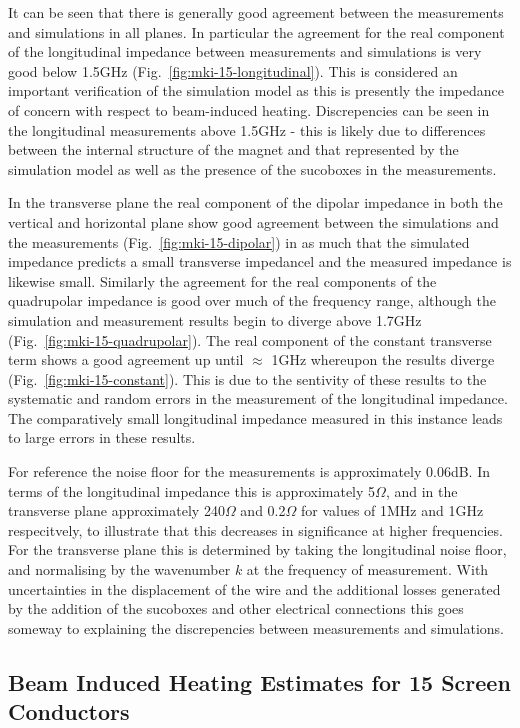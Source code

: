It can be seen that there is generally good agreement between the measurements and simulations in all planes. In particular the agreement for the real component of the longitudinal impedance between measurements and simulations is very good below 1.5GHz (Fig.~\ref{fig:mki-15-longitudinal}). This is considered an important verification of the simulation model as this is presently the impedance of  concern with respect to beam-induced heating. Discrepencies can be seen in the longitudinal measurements above 1.5GHz - this is likely due to differences between the internal structure of the magnet and that represented by the simulation model as well as the presence of the sucoboxes in the measurements.

In the transverse plane the real component of the dipolar impedance in both the vertical and horizontal plane show good agreement between the simulations and the measurements (Fig.~\ref{fig:mki-15-dipolar}) in as much that the simulated impedance predicts a small transverse impedancel and the measured impedance is likewise small. Similarly the agreement for the real components of the quadrupolar impedance is good over much of the frequency range, although the simulation and measurement results begin to diverge above 1.7GHz (Fig.~\ref{fig:mki-15-quadrupolar}). The real component of the constant transverse term shows a good agreement up until $\approx$ 1GHz whereupon the results diverge (Fig.~\ref{fig:mki-15-constant}). This is due to the sentivity of these results to the systematic and random errors in the measurement of the longitudinal impedance. The comparatively small longitudinal impedance measured in this instance leads to large errors in these results. 

For reference the noise floor for the measurements is approximately 0.06dB. In terms of the longitudinal impedance this is approximately 5$\Omega$, and in the transverse plane approximately 240$\Omega$ and 0.2$\Omega$ for values of 1MHz and 1GHz respecitvely, to illustrate that this decreases in significance at higher frequencies. For the transverse plane this is determined by taking the longitudinal noise floor, and normalising by the wavenumber $k$ at the frequency of measurement. With uncertainties in the displacement of the wire and the additional losses generated by the addition of the sucoboxes and other electrical connections this goes someway to explaining the discrepencies between measurements and simulations. 

\subsection{Beam Induced Heating Estimates for 15 Screen Conductors}


